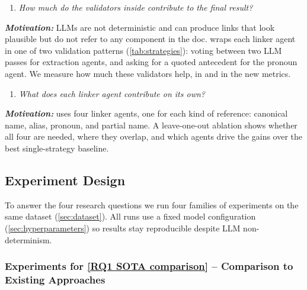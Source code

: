 \begin{enumerate}[leftmargin=*, labelindent=0em, label=\textbf{RQ\arabic*}:, ref=RQ\arabic*, series=researchQuestions, resume]
    \item \label{RQ3 validators} \emph{How much do the validators inside \approach{} contribute to the final result?}
\end{enumerate}
\emph{\textbf{Motivation:}}
\acp{LLM} are not deterministic and can produce links that look plausible but do not refer to any component in the doc.
\approach{} wraps each linker agent in one of two validation patterns (\autoref{tab:strategies}): voting between two \ac{LLM} passes for extraction agents, and asking for a quoted antecedent for the pronoun agent.
We measure how much these validators help, in \fone and in the new metrics.

\begin{enumerate}[leftmargin=*, labelindent=0em, label=\textbf{RQ\arabic*}:, ref=RQ\arabic*, series=researchQuestions, resume]
    \item \label{RQ4 ablation} \emph{What does each linker agent contribute on its own?}
\end{enumerate}
\emph{\textbf{Motivation:}}
\approach{} uses four linker agents, one for each kind of reference: canonical name, alias, pronoun, and partial name.
A leave-one-out ablation shows whether all four are needed, where they overlap, and which agents drive the gains over the best single-strategy baseline.

\subsection{Experiment Design}
\label{sec:exp-design}

To answer the four research questions we run four families of experiments on the same dataset (\autoref{sec:dataset}).
All \approach{} runs use a fixed model configuration (\autoref{sec:hyperparameters}) so results stay reproducible despite \ac{LLM} non-determinism.

\subsubsection{Experiments for \ref{RQ1 SOTA comparison} -- Comparison to Existing Approaches}
\label{sec:exp:rq1}

